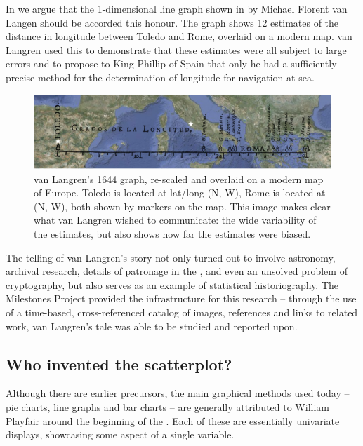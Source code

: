In \citet{Friendly-etal:2010:langren} we argue that the 1-dimensional line graph shown in  by Michael Florent van Langen \citep{Langren:1644} should be accorded this honour. The graph shows 12 estimates of the distance in longitude between Toledo and Rome, overlaid on a modern map. van Langren used this to demonstrate that these estimates were all subject to large errors and to
propose to King Phillip of Spain that only he had a sufficiently precise method for the determination of longitude for navigation at sea.

\begin{figure}[htb]
 \centering
 \includegraphics[width=\textwidth]{fig/langren-google-overlay2}
 \caption{van Langren's 1644 graph, re-scaled and overlaid on a modern map of Europe. Toledo is located at lat/long %
(N, W), Rome is located at (N, W), both shown by markers on the map.  This image makes clear what van Langren wished to communicate: the wide variability of the estimates, but also shows how far the estimates were biased.}%
\label{fig:langren-google-overlay}
\end{figure}

The telling of van Langren's story not only turned out to involve astronomy, archival research, details of patronage in the , and even an unsolved problem of cryptography, but also serves as an example of statistical historiography.  The Milestones Project provided the infrastructure for this research -- through the use of a time-based, cross-referenced catalog of images, references and links to related work, van Langren's tale was able to be studied and reported upon.

\subsection{Who invented the scatterplot?}
Although there are earlier precursors, the main graphical methods used today --
pie charts, line graphs and bar charts -- are generally attributed to William Playfair around the beginning of the  \citep{Playfair:1786,Playfair:1801}. Each of these are essentially univariate displays, showcasing some aspect of a single variable. 

